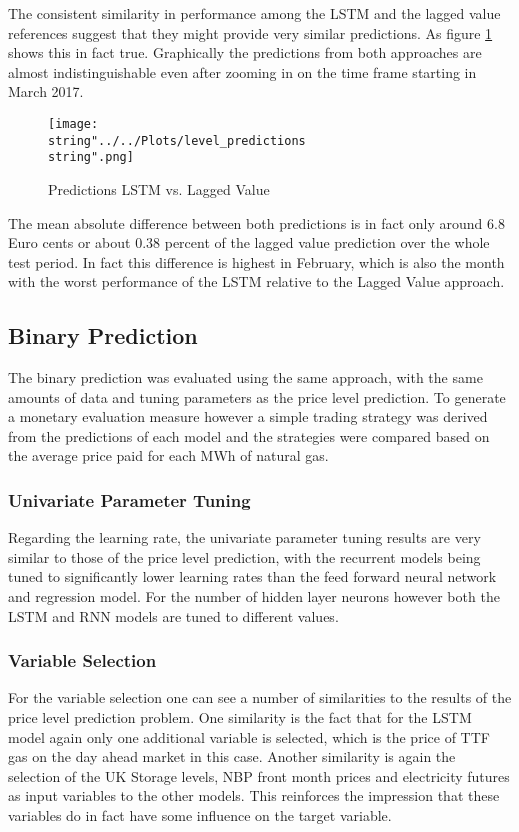 The consistent similarity in performance among the LSTM and the lagged value references suggest that they might provide very similar  predictions. As figure \ref{fig:level_predictions} shows this in fact true. Graphically the predictions from both approaches are almost indistinguishable even after zooming in on the time frame starting in March 2017.

\begin{figure}[h!]
  \centering
\texttt{[image: \\string"../../Plots/level\_predictions\\string".png]}
  \caption{Predictions LSTM vs. Lagged Value }\label{fig:level_predictions}
\end{figure}

The mean absolute difference between both predictions is in fact only around $6.8$ Euro cents or about $0.38$ percent of the lagged value prediction over the whole test period. In fact this difference is highest in February, which is also the month with the worst performance of the LSTM relative to the Lagged Value approach. 
\FloatBarrier
\subsection{Binary Prediction}
The binary prediction was evaluated using the same approach, with the same amounts of data and tuning parameters as the price level prediction. To generate a monetary evaluation measure however a simple trading strategy was derived from the predictions of each model and the strategies were compared based on the average price paid for each MWh of natural gas.
\subsubsection{Univariate Parameter Tuning}
Regarding the learning rate, the univariate parameter tuning results are very similar to those of the price level prediction, with the recurrent models being tuned to significantly lower learning rates than the feed forward neural network and regression model. For the number of hidden layer neurons however both the LSTM and RNN models are tuned to different values.

\subsubsection{Variable Selection}
For the variable selection one can see a number of similarities to the results of the price level prediction problem. One similarity is the fact that for the LSTM model again only one additional variable is selected, which is the price of TTF gas on the day ahead market in this case. Another similarity is again the selection of the UK Storage levels, NBP front month prices and electricity futures as input variables to the other models. This reinforces the impression that these variables do in fact have some influence on the target variable.


